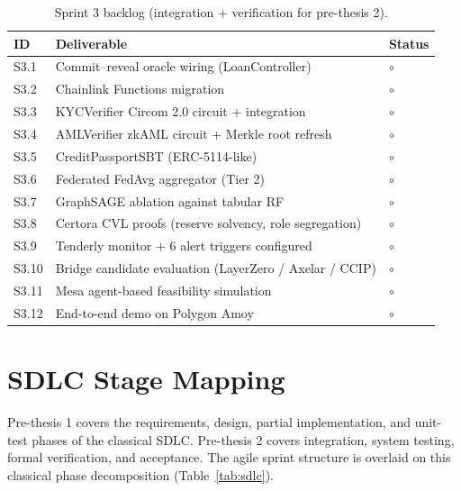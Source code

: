 \documentclass[12pt,a4paper]{report}
\newcommand{\tmarkPlanned}{$\circ$}
\begin{document}
\begin{table}[!t]
\centering
\caption{Sprint 3 backlog (integration + verification for pre-thesis 2).}
\label{tab:sprint-3}
\small
\begin{tabularx}{\linewidth}{@{}lYR{1.6cm}@{}}
\toprule
\textbf{ID} & \textbf{Deliverable} & \textbf{Status} \\
\midrule
S3.1 & Commit--reveal oracle wiring (LoanController) & \tmarkPlanned \\
S3.2 & Chainlink Functions migration & \tmarkPlanned \\
S3.3 & KYCVerifier Circom 2.0 circuit + integration & \tmarkPlanned \\
S3.4 & AMLVerifier zkAML circuit + Merkle root refresh & \tmarkPlanned \\
S3.5 & CreditPassportSBT (ERC-5114-like) & \tmarkPlanned \\
S3.6 & Federated FedAvg aggregator (Tier 2) & \tmarkPlanned \\
S3.7 & GraphSAGE ablation against tabular RF & \tmarkPlanned \\
S3.8 & Certora CVL proofs (reserve solvency, role segregation) & \tmarkPlanned \\
S3.9 & Tenderly monitor + 6 alert triggers configured & \tmarkPlanned \\
S3.10 & Bridge candidate evaluation (LayerZero / Axelar / CCIP) & \tmarkPlanned \\
S3.11 & Mesa agent-based feasibility simulation & \tmarkPlanned \\
S3.12 & End-to-end demo on Polygon Amoy & \tmarkPlanned \\
\bottomrule
\end{tabularx}
\end{table}

\section{SDLC Stage Mapping}
\label{sec:sdlc}

Pre-thesis 1 covers the requirements, design, partial implementation, and unit-test phases of the classical SDLC. Pre-thesis 2 covers integration, system testing, formal verification, and acceptance. The agile sprint structure is overlaid on this classical phase decomposition (Table~\ref{tab:sdlc}).
\end{document}
